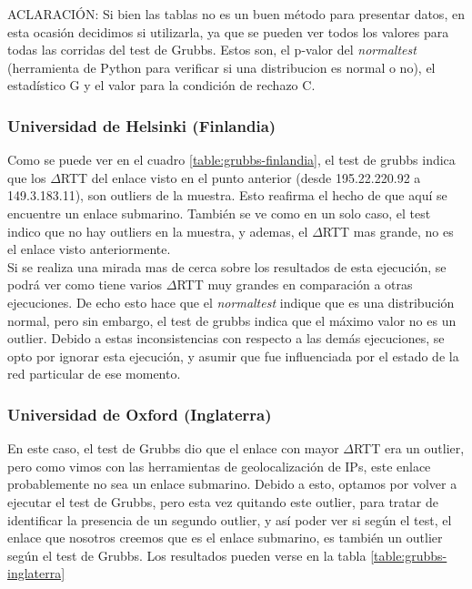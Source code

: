 ACLARACIÓN: Si bien las tablas no es un buen método para presentar datos, en esta ocasión decidimos si utilizarla, ya que se pueden ver todos los valores para todas las corridas del test de Grubbs. Estos son, el p-valor del \textit{normaltest} (herramienta de Python para verificar si una distribucion es normal o no), el estadístico G y el valor para la condición de rechazo C. \\

\subsubsection{Universidad de Helsinki (Finlandia)}

Como se puede ver en el cuadro \ref{table:grubbs-finlandia}, el test de grubbs indica que los $\Delta$RTT del enlace visto en el punto anterior (desde 195.22.220.92 a 149.3.183.11), son outliers de la muestra. Esto reafirma el hecho de que aquí se encuentre un enlace submarino. También se ve como en un solo caso, el test indico que no hay outliers en la muestra, y ademas, el $\Delta$RTT mas grande, no es el enlace visto anteriormente. \\

Si se realiza una mirada mas de cerca sobre los resultados de esta ejecución, se podrá ver como tiene varios $\Delta$RTT muy grandes en comparación a otras ejecuciones. De echo esto hace que el \textit{normaltest} indique que es una distribución normal, pero sin embargo, el test de grubbs indica que el máximo valor no es un outlier. Debido a estas inconsistencias con respecto a las demás ejecuciones, se opto por ignorar esta ejecución, y asumir que fue influenciada por el estado de la red particular de ese momento.


\subsubsection{Universidad de Oxford (Inglaterra)}

En este caso, el test de Grubbs dio que el enlace con mayor $\Delta$RTT era un outlier, pero como vimos con las herramientas de geolocalización de IPs, este enlace probablemente no sea un enlace submarino. Debido a esto, optamos por volver a ejecutar el test de Grubbs, pero esta vez quitando este outlier, para tratar de identificar la presencia de un segundo outlier, y así poder ver si según el test, el enlace que nosotros creemos que es el enlace submarino, es también un outlier según el test de Grubbs. Los resultados pueden verse en la tabla \ref{table:grubbs-inglaterra}\\

